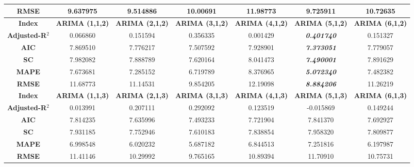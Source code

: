 \documentclass[12pt]{article}  %
\begin{document}
\begin{table}[]
{\begin{tabular}{ccccccc}
\textbf{RMSE} &
  9.637975 &
  9.514886 &
  10.00691 &
  11.98773 &
  9.725911 &
  10.72635 \\ \hline
\textbf{Index} &
  \textbf{ARIMA (1,1,2)} &
  \textbf{ARIMA (2,1,2)} &
  \textbf{ARIMA (3,1,2)} &
  \multicolumn{1}{c}{\textbf{ARIMA (4,1,2)}} &
  {\color[HTML]{000000} \textbf{ARIMA (5,1,2)}} &
  \textbf{ARIMA (6,1,2)} \\
\textbf{Adjusted-R$^2$} &
  0.066860 &
  0.151594 &
  0.356335 &
  \multicolumn{1}{c}{0.001429} &
  \multicolumn{1}{c}{{\color[HTML]{CB0000} \textit{\textbf{0.401740}}}} &
  0.151327 \\
\textbf{AIC} &
  7.869510 &
  7.776217 &
  7.507592 &
  \multicolumn{1}{c}{7.928901} &
  \multicolumn{1}{c}{{\color[HTML]{CB0000} \textit{\textbf{7.373051}}}} &
  7.779057 \\
\textbf{SC} &
  7.982082 &
  7.888789 &
  7.620164 &
  \multicolumn{1}{c}{8.041473} &
  \multicolumn{1}{c}{{\color[HTML]{CB0000} \textit{\textbf{7.490001}}}} &
  7.891629 \\
\textbf{MAPE} &
  7.673681 &
  7.285152 &
  6.719789 &
  \multicolumn{1}{c}{8.376965} &
  \multicolumn{1}{c}{{\color[HTML]{CB0000} \textit{\textbf{5.072340}}}} &
  7.482382 \\
\textbf{RMSE} &
  11.68773 &
  11.14531 &
  9.854205 &
  \multicolumn{1}{c}{12.19098} &
  \multicolumn{1}{c}{{\color[HTML]{CB0000} \textit{\textbf{8.884206}}}} &
  11.26219 \\ \hline
\textbf{Index} &
  \textbf{ARIMA (1,1,3)} &
  \textbf{ARIMA (2,1,3)} &
  \textbf{ARIMA (3,1,3)} &
  \textbf{ARIMA (4,1,3)} &
  \textbf{ARIMA (5,1,3)} &
  \textbf{ARIMA (6,1,3)} \\
\textbf{Adjusted-R$^2$} &
  0.013991 &
  0.207111 &
  0.292092 &
  0.123519 &
  -0.015869 &
  0.149244 \\
\textbf{AIC} &
  7.814235 &
  7.635996 &
  7.493233 &
  7.721904 &
  7.841370 &
  7.692927 \\
\textbf{SC} &
  7.931185 &
  7.752946 &
  7.610183 &
  7.838854 &
  7.958320 &
  7.809877 \\
\textbf{MAPE} &
  6.998548 &
  6.020232 &
  5.687182 &
  6.844513 &
  7.251816 &
  6.197987 \\
\textbf{RMSE} &
  11.41146 &
  10.29992 &
  9.765165 &
  10.89394 &
  11.70910 &
  10.75731 \\ \hline
\end{tabular}}
\end{table}
\end{document}
